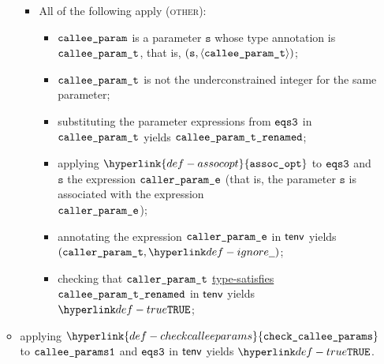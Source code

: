 \documentclass{book}
\newcommand\ProseOrTypeError[0]{\ProseTerminateAs{\TypeErrorConfig}}
\newcommand\assocopt[0]{\hyperlink{def-assocopt}{\texttt{assoc\_opt}}}
\newcommand\checkcalleeparams[0]{\hyperlink{def-checkcalleeparams}{\texttt{check\_callee\_params}}}
\newcommand\typesatisfies[0]{\hyperlink{def-typesatisfies}{type-satisfies}}
\newcommand\vs[0]{\texttt{s}}
\begin{document}
\begin{itemize}
\begin{itemize}
\begin{itemize}
      \item All of the following apply (\textsc{other}):
      \begin{itemize}
        \item $\texttt{callee\_param}$ is a parameter $\vs$ whose type annotation is \\
              $\texttt{callee\_param\_t}$, that is, $(\vs, \langle\calleeparamt\rangle)$;
        \item $\texttt{callee\_param\_t}$ is not the underconstrained integer for the same parameter;
        \item substituting the parameter expressions from $\texttt{eqs3}$ in $\texttt{callee\_param\_t}$
              yields $\texttt{callee\_param\_t\_renamed}$\ProseOrTypeError;
        \item applying $\assocopt$ to $\texttt{eqs3}$ and $\vs$ the expression $\texttt{caller\_param\_e}$
              (that is, the parameter $\vs$ is associated with the expression \\
              $\texttt{caller\_param\_e}$);
        \item annotating the expression $\texttt{caller\_param\_e}$ in $\textsf{tenv}$ yields \\
              $(\callerparamt, \Ignore)$\ProseOrTypeError;
        \item checking that $\texttt{caller\_param\_t}$ \typesatisfies\ $\texttt{callee\_param\_t\_renamed}$ in $\textsf{tenv}$ yields
              $\True$\ProseOrTypeError;
      \end{itemize}
    \end{itemize}
    \item applying $\checkcalleeparams$ to $\texttt{callee\_params1}$ and $\texttt{eqs3}$ in $\textsf{tenv}$
          yields $\True$\ProseOrTypeError.
  \end{itemize}
\end{itemize}
\end{document}
